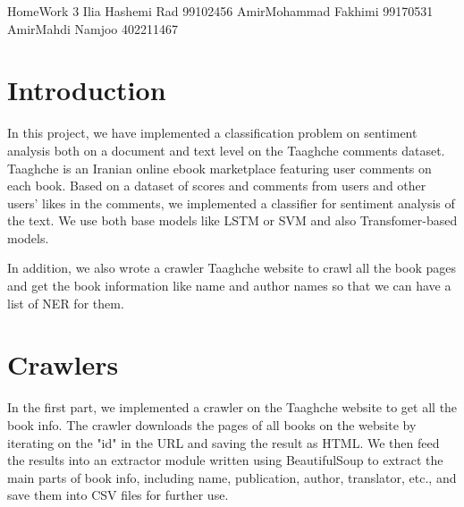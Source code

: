 \documentclass{solutionclass} %
\begin{document}
\pretitle
{HomeWork 3} %
{Ilia Hashemi Rad}
{99102456}
{AmirMohammad Fakhimi}
{99170531}
{AmirMahdi Namjoo}
{402211467}

\def\homeworkNumber{2}

\makeatletter
    \startcontents[sections]
\makeatother
    \def\Solu{Explanations}

\section{Introduction}

\begin{solution}
    In this project, we have implemented a classification problem on sentiment analysis both on a document and text level on the Taaghche comments dataset. Taaghche is an Iranian online ebook marketplace featuring user comments on each book. Based on a dataset of scores and comments from users and other users' likes in the comments, we implemented a classifier for sentiment analysis of the text. We use both base models like LSTM or SVM and also Transfomer-based models.

    In addition, we also wrote a crawler Taaghche website to crawl all the book pages and get the book information like name and author names so that we can have a list of NER for them.
\end{solution}


\section{Crawlers}

\begin{solution}
In the first part, we implemented a crawler on the Taaghche website to get all the book info. The crawler downloads the pages of all books on the website by iterating on the "id" in the URL and saving the result as HTML. We then feed the results into an extractor module written using BeautifulSoup to extract the main parts of book info, including name, publication, author, translator, etc., and save them into CSV files for further use.
\end{solution}
\end{document}
